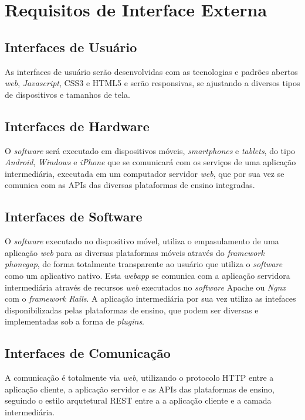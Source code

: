 \section{Requisitos de Interface Externa}

\subsection{Interfaces de Usuário}
As interfaces de usuário serão desenvolvidas com as tecnologias e padrões abertos \textit{web}, \textit{Javascript}, CSS3 e HTML5 e serão responsivas, se ajustando a diversos tipos de dispositivos e tamanhos de tela.

\subsection{Interfaces de Hardware}

O \textit{software} será executado em dispositivos móveis, \textit{smartphones} e \textit{tablets}, do tipo \textit{Android}, \textit{Windows} e \textit{iPhone} que se comunicará com os serviços de uma aplicação intermediária, executada em um computador servidor \textit{web}, que por sua vez se comunica com as APIs das diversas plataformas de ensino integradas.

\subsection{Interfaces de Software}

O \textit{software} executado no dispositivo móvel, utiliza o empasulamento de uma aplicação \textit{web} para as diversas plataformas móveis através do \textit{framework} \textit{phonegap}, de forma totalmente transparente ao usuário que utiliza o \textit{software} como um aplicativo nativo. Esta \textit{webapp} se comunica com a aplicação servidora intermediária através de recursos \textit{web} executados no \textit{software} Apache ou \textit{Ngnx} com o \textit{framework} \textit{Rails}. A aplicação intermediária por sua vez utiliza as intefaces disponibilizadas pelas plataformas de ensino, que podem ser diversas e implementadas sob a forma de \textit{plugins}.

\subsection{Interfaces de Comunicação}

A comunicação é totalmente via \textit{web}, utilizando o protocolo HTTP entre a aplicação cliente, a aplicação servidor e as APIs das plataformas de ensino, seguindo o estilo arqutetural REST entre a a aplicação cliente e a camada intermediária.

